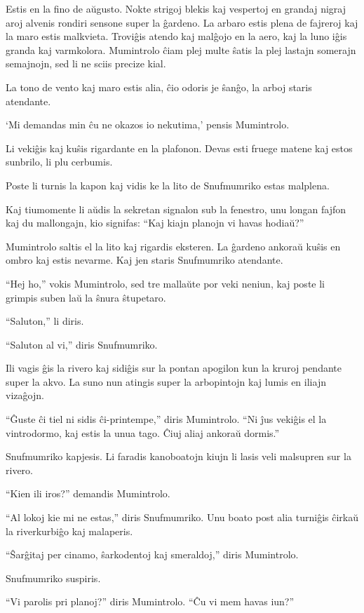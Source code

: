 \noindent Estis en la fino de aŭgusto. Nokte strigoj blekis kaj vespertoj en grandaj nigraj aroj alvenis rondiri sensone super la ĝardeno. La arbaro estis plena de fajreroj kaj la maro estis malkvieta. Troviĝis atendo kaj malĝojo en la aero, kaj la luno iĝis granda kaj varmkolora. Mumintrolo ĉiam plej multe ŝatis la plej lastajn somerajn semajnojn, sed li ne sciis precize kial.

La tono de vento kaj maro estis alia, ĉio odoris je ŝanĝo, la arboj staris atendante.

`Mi demandas min ĉu ne okazos io nekutima,' pensis Mumintrolo.

Li vekiĝis kaj kuŝis rigardante en la plafonon. Devas esti fruege matene kaj estos sunbrilo, li plu cerbumis.

Poste li turnis la kapon kaj vidis ke la lito de Snufmumriko estas malplena.

Kaj tiumomente li aŭdis la sekretan signalon sub la fenestro, unu longan fajfon kaj du mallongajn, kio signifas: ``Kaj kiajn planojn vi havas hodiaŭ?''

Mumintrolo saltis el la lito kaj rigardis eksteren. La ĝardeno ankoraŭ kuŝis en ombro kaj estis nevarme. Kaj jen staris Snufmumriko atendante.

``Hej ho,'' vokis Mumintrolo, sed tre mallaŭte por veki neniun, kaj poste li grimpis suben laŭ la ŝnura ŝtupetaro.

``Saluton,'' li diris.

``Saluton al vi,'' diris Snufmumriko.

Ili vagis ĝis la rivero kaj sidiĝis sur la pontan apogilon kun la kruroj pendante super la akvo. La suno nun atingis super la arbopintojn kaj lumis en iliajn vizaĝojn.

``Ĝuste ĉi tiel ni sidis ĉi-printempe,'' diris Mumintrolo. ``Ni ĵus vekiĝis el la vintrodormo, kaj estis la unua tago. Ĉiuj aliaj ankoraŭ dormis.''

Snufmumriko kapjesis. Li faradis kanoboatojn kiujn li lasis veli malsupren sur la rivero.

``Kien ili iros?'' demandis Mumintrolo.

``Al lokoj kie mi ne estas,'' diris Snufmumriko. Unu boato post alia turniĝis ĉirkaŭ la riverkurbiĝo kaj malaperis.

``Ŝarĝitaj per cinamo, ŝarkodentoj kaj smeraldoj,'' diris Mumintrolo.

Snufmumriko suspiris.

``Vi parolis pri planoj?'' diris Mumintrolo. ``Ĉu vi mem havas iun?''

